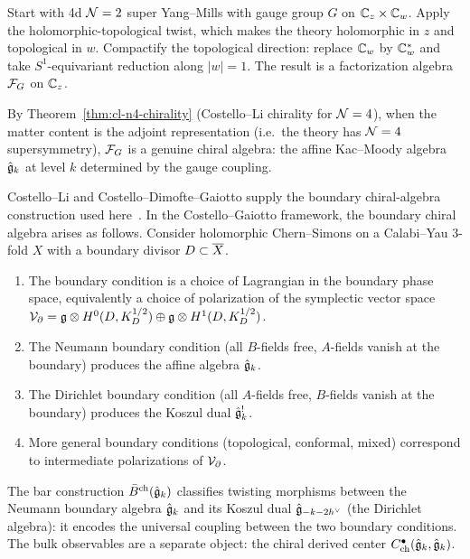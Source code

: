 \begin{setup}[4d $\cN = 2$ SYM with HT twist]
Start with 4d $\cN = 2$ super Yang--Mills with gauge group $G$ on
$\mathbb{C}_z \times \mathbb{C}_w$. Apply the holomorphic-topological twist, which
makes the theory holomorphic in $z$ and topological in $w$. Compactify
the topological direction: replace $\mathbb{C}_w$ by $\mathbb{C}^*_w$ and take
$S^1$-equivariant reduction along $|w| = 1$. The result is a
factorization algebra $\mathcal{F}_G$ on $\mathbb{C}_z$.

By Theorem~\ref*{thm:cl-n4-chirality} (Costello--Li chirality for
$\mathcal{N} = 4$), when the matter content is the adjoint representation (i.e.\
the theory has $\mathcal{N} = 4$ supersymmetry), $\mathcal{F}_G$ is a genuine chiral
algebra: the affine Kac--Moody algebra $\hat{\mathfrak{g}}_k$ at level $k$
determined by the gauge coupling.
\end{setup}

\begin{theorem}
Costello--Li and Costello--Dimofte--Gaiotto supply the
boundary chiral-algebra construction used here~\cite{CL16,CDG20}.
In the Costello--Gaiotto framework, the boundary chiral algebra arises
as follows. Consider holomorphic Chern--Simons on a Calabi--Yau 3-fold
$X$ with a boundary divisor $D \subset \overline{X}$.
\begin{enumerate}
\item The boundary condition is a choice of Lagrangian in the
 boundary phase space, equivalently a choice of polarization of
 the symplectic vector space
 $\mathcal{V}_\partial = \mathfrak{g} \otimes H^0(D, K_D^{1/2})
 \oplus \mathfrak{g} \otimes H^1(D, K_D^{1/2})$.
\item The Neumann boundary condition (all $B$-fields free, $A$-fields
 vanish at the boundary) produces the affine algebra $\hat{\mathfrak{g}}_k$.
\item The Dirichlet boundary condition (all $A$-fields free, $B$-fields
 vanish at the boundary) produces the Koszul dual $\hat{\mathfrak{g}}_k^!$.
\item More general boundary conditions (topological, conformal,
 mixed) correspond to intermediate polarizations of $\mathcal{V}_\partial$.
\end{enumerate}
\end{theorem}

\begin{remark}
The bar construction $\bar{B}^{\mathrm{ch}}(\hat{\mathfrak{g}}_k)$ classifies twisting morphisms
between the Neumann boundary algebra $\hat{\mathfrak{g}}_k$ and its Koszul dual
$\hat{\mathfrak{g}}_{-k-2h^\vee}$ (the Dirichlet algebra): it encodes
the universal coupling between the two boundary conditions.
The bulk observables are a separate object: the chiral derived center
$C^\bullet_{\mathrm{ch}}(\hat{\mathfrak{g}}_k, \hat{\mathfrak{g}}_k)$.
\end{remark}

